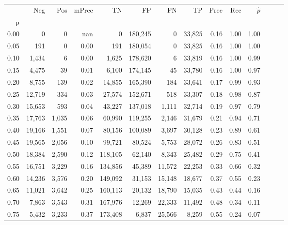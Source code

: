 \begin{tabular}{rrrrrrrrrrrrrr}
\toprule
{} &     Neg &    Pos & mPrec &       TN &       FP &      FN &      TP &  Prec &   Rec & $\hat{p}$ \\
p    &         &        &       &          &          &         &         &       &       &           \\
\midrule
0.00 &       0 &      0 &   nan &        0 &  180,245 &       0 &  33,825 &  0.16 &  1.00 &      1.00 \\
0.05 &     191 &      0 &  0.00 &      191 &  180,054 &       0 &  33,825 &  0.16 &  1.00 &      1.00 \\
0.10 &   1,434 &      6 &  0.00 &    1,625 &  178,620 &       6 &  33,819 &  0.16 &  1.00 &      0.99 \\
0.15 &   4,475 &     39 &  0.01 &    6,100 &  174,145 &      45 &  33,780 &  0.16 &  1.00 &      0.97 \\
0.20 &   8,755 &    139 &  0.02 &   14,855 &  165,390 &     184 &  33,641 &  0.17 &  0.99 &      0.93 \\
0.25 &  12,719 &    334 &  0.03 &   27,574 &  152,671 &     518 &  33,307 &  0.18 &  0.98 &      0.87 \\
0.30 &  15,653 &    593 &  0.04 &   43,227 &  137,018 &   1,111 &  32,714 &  0.19 &  0.97 &      0.79 \\
0.35 &  17,763 &  1,035 &  0.06 &   60,990 &  119,255 &   2,146 &  31,679 &  0.21 &  0.94 &      0.71 \\
0.40 &  19,166 &  1,551 &  0.07 &   80,156 &  100,089 &   3,697 &  30,128 &  0.23 &  0.89 &      0.61 \\
0.45 &  19,565 &  2,056 &  0.10 &   99,721 &   80,524 &   5,753 &  28,072 &  0.26 &  0.83 &      0.51 \\
0.50 &  18,384 &  2,590 &  0.12 &  118,105 &   62,140 &   8,343 &  25,482 &  0.29 &  0.75 &      0.41 \\
0.55 &  16,751 &  3,229 &  0.16 &  134,856 &   45,389 &  11,572 &  22,253 &  0.33 &  0.66 &      0.32 \\
0.60 &  14,236 &  3,576 &  0.20 &  149,092 &   31,153 &  15,148 &  18,677 &  0.37 &  0.55 &      0.23 \\
0.65 &  11,021 &  3,642 &  0.25 &  160,113 &   20,132 &  18,790 &  15,035 &  0.43 &  0.44 &      0.16 \\
0.70 &   7,863 &  3,543 &  0.31 &  167,976 &   12,269 &  22,333 &  11,492 &  0.48 &  0.34 &      0.11 \\
0.75 &   5,432 &  3,233 &  0.37 &  173,408 &    6,837 &  25,566 &   8,259 &  0.55 &  0.24 &      0.07 \\

\end{tabular}
